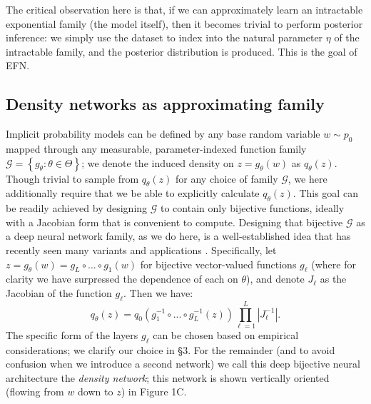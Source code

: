 \documentclass{article}
\begin{document}
The critical observation here is that, if we can approximately learn an intractable exponential family (the model itself), then it becomes trivial to perform posterior inference: we simply use the dataset to index into the natural parameter $\eta$ of the intractable family, and the posterior distribution is produced.  This is the goal of EFN.

%


 \subsection{Density networks as approximating family}

Implicit probability models can be defined by any base random variable $w\sim p_0$ mapped through any measurable, parameter-indexed function family  $\mathcal{G} = \left\{g_\theta: \theta \in \Theta\right\}$; we denote the induced density on $z=g_\theta(w)$ as $q_\theta(z)$.   
Though trivial to sample from $q_\theta(z)$ for any choice of family $\mathcal{G}$, we here additionally require that we be able to explicitly calculate $q_\theta(z)$.  
This goal can be readily achieved by designing $\mathcal{G}$ to contain only bijective functions, ideally with a Jacobian form that is convenient to compute. %
Designing that bijective $\mathcal{G}$ as a deep neural network family, as we do here, is a well-established idea that has recently seen many variants and applications \cite{mackay1997density, baird2005one, tabak2010density, rippel2013high, uria2013rnade, rezende2015variational, dinh2016density, papamakarios2017masked, jacobsen2018revnet}.  Specifically, let $z = g_\theta(w) = g_L \circ ... \circ g_1(w)$ for bijective vector-valued functions $g_\ell$ (where for clarity we have surpressed the dependence of each on $\theta$), and denote $J_\ell$ as the Jacobian of the function $g_\ell$.  Then we have:
%
$$q_\theta(z) = q_0\left( g_1^{-1} \circ ... \circ g_L^{-1}(z) \right) \prod_{\ell=1}^L | J_\ell^{-1} |.$$
%
The specific form of the layers $g_\ell$ can be chosen based on empirical considerations; we clarify our choice in \S3.  For the remainder (and to avoid confusion when we introduce a second network) we call this deep bijective neural architecture the \emph{density network}; this network is shown vertically oriented (flowing from $w$ down to $z$) in Figure 1C.
\end{document}
